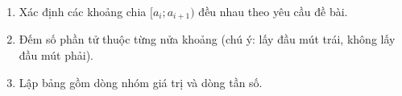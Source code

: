 \begin{enumerate}
\item Xác định các khoảng chia $[a_i; a_{i+1})$ đều nhau theo yêu cầu đề bài.
\item Đếm số phần tử thuộc từng nửa khoảng (chú ý: lấy đầu mút trái, không lấy đầu mút phải).
\item Lập bảng gồm dòng nhóm giá trị và dòng tần số.
\end{enumerate}
